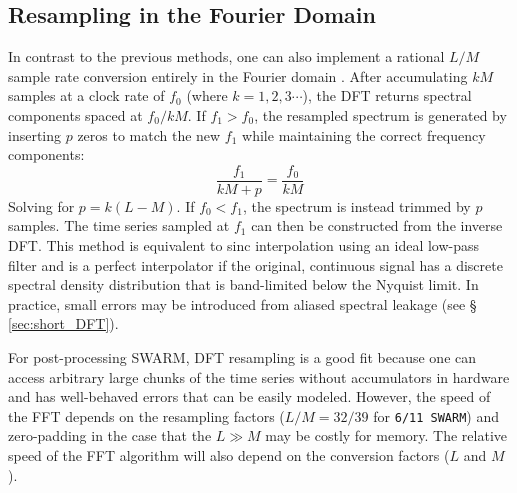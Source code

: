 \documentclass[11pt,preprint]{aastex}
\newcommand{\SWARM}[1]{\texttt{#1\,SWARM}}
\begin{document}
\subsection{Resampling in the Fourier Domain} \label{sec:fourier_resampling}
In contrast to the previous methods, one can also implement a rational $L/M$ sample rate conversion entirely in 
the Fourier domain \citep{gold69,yeh82}.  After accumulating $kM$ samples at a clock rate of $f_0$ 
(where $k=1,2,3\cdots$), the DFT 
returns spectral components spaced at $f_0/kM$.  If $f_1 > f_0$, the resampled spectrum is generated by inserting
$p$ zeros to match the new $f_1$ while maintaining the correct frequency components: 
\begin{equation}
\frac{f_1}{kM+p} = \frac{f_0}{kM}
\end{equation} 
Solving for $p = k(L - M)$.  If $f_0 < f_1$, the spectrum is instead trimmed by $p$ samples.  The time series
sampled at $f_1$ can then be constructed from the inverse DFT.  This method is equivalent to sinc 
interpolation using an ideal low-pass filter and is a perfect interpolator
if the original, continuous signal has a discrete spectral density distribution that is band-limited below the 
Nyquist limit.  In practice, small errors may be introduced from aliased spectral leakage (see \S 
\ref{sec:short_DFT}). 

For post-processing SWARM, DFT resampling is a good fit because one can 
access arbitrary large chunks of the time series without accumulators in hardware and has well-behaved errors
that can be easily modeled.  However, the speed of the FFT depends on the resampling factors ($L/M = 32/39$ for 
\SWARM{6/11}) and zero-padding in the case that the $L\gg M$ may be costly for memory.  The relative speed of the 
FFT algorithm will also depend on the conversion factors ($L$ and $M$).

\end{document}
